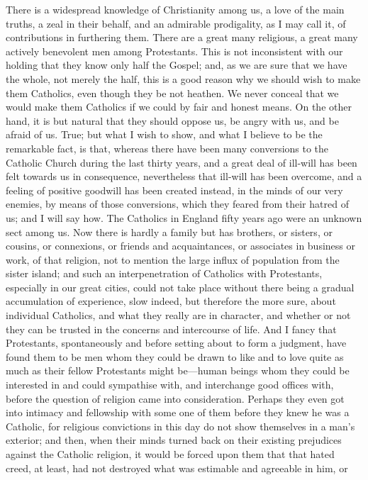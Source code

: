 There is a widespread knowledge of Christianity among us, a love of
the main truths, a zeal in their behalf, and an admirable prodigality,
as I may call it, of contributions in furthering them. There are a
great many religious, a great many actively benevolent men among
Protestants. This is not inconsistent with our holding that they know
only half the Gospel; and, as we are sure that we have the whole, not
merely the half, this is a good reason why we should wish to make them
Catholics, even though they be not heathen. We never conceal that we
would make them Catholics if we could by fair and honest means. On the
other hand, it is but natural that they should oppose us, be angry
with us, and be afraid of us. True; but what I wish to show, and what
I believe to be the remarkable fact, is that, whereas there have been
many conversions to the Catholic Church during the last thirty years,
and a great deal of ill-will has been felt towards us in consequence,
nevertheless that ill-will has been overcome, and a feeling of
positive goodwill has been created instead, in the minds of our very
enemies, by means of those conversions, which they feared from their
hatred of us; and I will say how. The Catholics in England fifty years
ago were an unknown sect among us. Now there is hardly a family but
has brothers, or sisters, or cousins, or connexions, or friends and
acquaintances, or associates in business or work, of that religion,
not to mention the large influx of population from the sister island;
and such an interpenetration of Catholics with Protestants, especially
in our great cities, could not take place without there being a
gradual accumulation of experience, slow indeed, but therefore the
more sure, about individual Catholics, and what they really are in
character, and whether or not they can be trusted in the concerns and
intercourse of life. And I fancy that Protestants, spontaneously and
before setting about to form a judgment, have found them to be men
whom they could be drawn to like and to love quite as much as their
fellow Protestants might be—human beings whom they could be
interested in and could sympathise with, and interchange good offices
with, before the question of religion came into consideration. Perhaps
they even got into intimacy and fellowship with some one of them
before they knew he was a Catholic, for religious convictions in this
day do not show themselves in a man's exterior; and then, when their
minds turned back on their existing prejudices against the Catholic
religion, it would be forced upon them that that hated creed, at
least, had not destroyed what was estimable and agreeable in him, or
